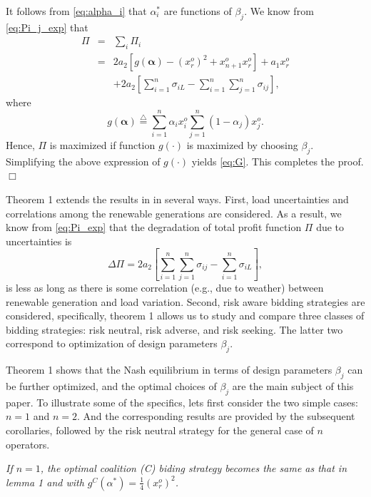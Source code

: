 \documentclass[conference]{IEEEtran}
\begin{document}
It follows from \eqref{eq:alpha_i} that $\alpha_i^*$ are functions of $\beta_j$. We know from  \eqref{eq:Pi_j_exp} that 
\begin{eqnarray}
    \Pi & = & \sum_i \Pi_i \nonumber \\
     & = & 2a_2\left[ g(\boldsymbol{\alpha}) - \left(x_r^o\right)^2 + x_{n+1}^o x_r^o\right]  +a_1 x_r^o  \nonumber \\ 
     && + 2a_2 \left[ \sum_{i=1}^n \sigma_{iL} -\sum_{i=1}^n\sum_{j=1}^n\sigma_{ij}\right], \label{eq:Pi_exp}
\end{eqnarray}
where
\[ g(\boldsymbol{\alpha}) \stackrel{\triangle}{=} \sum_{i=1}^n  \alpha_i x_i^o  \sum_{j=1}^n (1-\alpha_j ) x_j^o. \]
Hence, $\Pi$ is maximized if function $g(\cdot)$ is maximized by choosing $\beta_j$.
Simplifying the above expression of $g(\cdot)$ yields \eqref{eq:G}. This completes the proof. \hfill $\Box$

Theorem 1 extends the results in \cite{Chow2017} in several ways. First, load uncertainties and correlations among the renewable generations are considered.  As a result, we know from \eqref{eq:Pi_exp} that the degradation of total profit function $\Pi$ due to uncertainties is 
\[ \Delta \Pi = 2a_2 \left[ \sum_{i=1}^n\sum_{j=1}^n\sigma_{ij}- \sum_{i=1}^n \sigma_{iL}\right], \]
is less as long as there is some correlation (e.g., due to weather) between renewable generation and load variation. Second, risk aware bidding strategies are considered, specifically, theorem 1 allows us to study and compare three classes of bidding strategies: risk neutral, risk adverse, and risk seeking. The latter two correspond to optimization of design parameters $\beta_j$. 

Theorem 1 shows that the Nash equilibrium in terms of design parameters $\beta_j$ can be further optimized, and the optimal choices of $\beta_j$ are the main subject of this paper. To illustrate some of the specifics, lets first consider the two simple cases: $n=1$ and $n=2$. And the corresponding results are provided by the subsequent corollaries, followed by the risk neutral strategy for the general case of $n$ operators. 

 {\it If $n=1$, the optimal coalition (C) biding strategy becomes the same as that in lemma 1 and with $g^C(\alpha^*)=\frac{1}{4} (x_r^o)^2$.}
\end{document}
